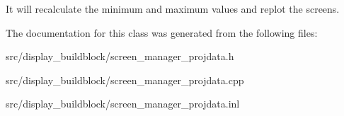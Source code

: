 It will recalculate the minimum and maximum values and replot the screens. 

The documentation for this class was generated from the following files\+:\begin{DoxyCompactItemize}
\item 
src/display\+\_\+buildblock/screen\+\_\+manager\+\_\+projdata.\+h\item 
src/display\+\_\+buildblock/screen\+\_\+manager\+\_\+projdata.\+cpp\item 
src/display\+\_\+buildblock/screen\+\_\+manager\+\_\+projdata.\+inl\end{DoxyCompactItemize}
